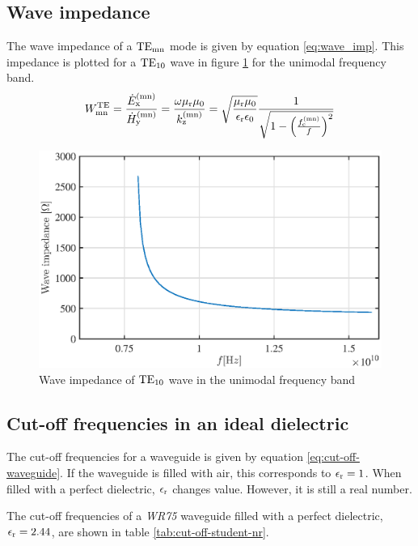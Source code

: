 \documentclass[12pt,a4paper, english, titlepage]{article}
\begin{document}
\subsection{Wave impedance}
The wave impedance of a ${\rm TE}_{\rm mn}$ mode is given by equation \ref{eq:wave_imp}. This impedance is plotted for a ${\rm TE}_{\rm 10}$ wave in figure \ref{fig:wave_imp} for the unimodal frequency band.
\begin{equation}
W_{\rm mn}^{\rm TE} = \frac{\dot E_{\rm x}^{\rm (mn)}} {\dot H_{\rm y}^{\rm (mn)}} = \frac{\omega \mu_{\rm r} \mu_{\rm 0}} {k_{\rm z}^{\rm (mn)}} = \sqrt{\frac{\mu_{\rm r} \mu_{\rm 0}}{\epsilon_{\rm r} \epsilon_{\rm 0}}} \frac{1}{\sqrt{1 - \left(\frac{f_{\rm c}^{\rm (mn)}}{f}\right)^2}}
\label{eq:wave_imp}
\end{equation}

\begin{figure}[h t b p]
\centering
\includegraphics[width=\textwidth,keepaspectratio]{figures/wave_imp.eps}
\caption{Wave impedance of ${\rm TE}_{\rm 10}$ wave in the unimodal frequency band}
\label{fig:wave_imp}
\end{figure}

\subsection{Cut-off frequencies in an ideal dielectric}
The cut-off frequencies for a waveguide is given by equation \ref{eq:cut-off-waveguide}. If the waveguide is filled with air, this corresponds to $\epsilon _{\rm r} = 1$. When filled with a perfect dielectric, $\epsilon _{\rm r}$ changes value. However, it is still a real number. \par
The cut-off frequencies of a \emph{WR75} waveguide filled with a perfect dielectric, $\epsilon _{\rm r} = 2.44$, are shown in table \ref{tab:cut-off-student-nr}.
\end{document}

